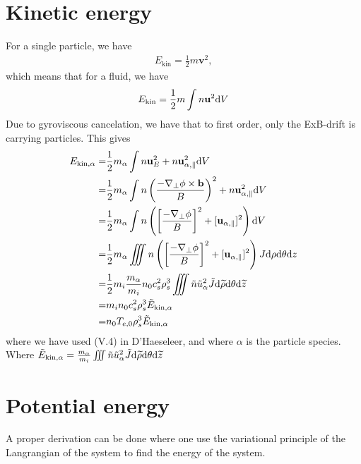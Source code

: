 \section{Kinetic energy}
For a single particle, we have
%
\begin{align*}
E_{\text{kin}} = \frac{1}{2}m\mathbf{v}^2,
\end{align*}
%
which means that for a fluid, we have
%
\begin{align*}
E_{\text{kin}}=\frac{1}{2}m\int n\mathbf{u}^2 \text{d} V
\end{align*}
%
Due to gyroviscous cancelation, we have that to first order, only the ExB-drift is carrying particles.
This gives
%
\begin{align*}
    E_{\text{kin},\alpha}
    =& \frac{1}{2}m_{\alpha}\int
       n\mathbf{u}_E^2
       + n\mathbf{u}_{\alpha,\parallel}^2 \text{d} V
     \\
    =& \frac{1}{2}m_{\alpha}\int
       n\left(\frac{-\nabla_\perp\phi
              \times\mathbf{b}}{B}\right)^2
       + n\mathbf{u}_{\alpha,\parallel}^2 \text{d} V
    \\
    =& \frac{1}{2}m_{\alpha}\int
       n\left(\left[\frac{-\nabla_\perp\phi}{B}\right]^2
       + [\mathbf{u}_{\alpha,\parallel}]^2\right) \text{d} V
   \\
    =& \frac{1}{2}m_{\alpha}\iiint
       n\left(\left[\frac{-\nabla_\perp\phi}{B}\right]^2
       + [\mathbf{u}_{\alpha,\parallel}]^2\right)
       J \text{d}\rho \text{d}\theta \text{d} z
    \\
    =& \frac{1}{2}m_i\frac{m_{\alpha}}{m_i}
       n_0c_s^2\rho_s^3
       \iiint
       \tilde{n}\tilde{u}_\alpha^2
       \tilde{J} \text{d} \widetilde{ \rho} \text{d}\theta \text{d} \widetilde{ z}
    \\
    =& m_in_0c_s^2\rho_s^3 \tilde{E}_{\text{kin},\alpha}
    \\
    =& n_0T_{e,0}\rho_s^3 \tilde{E}_{\text{kin},\alpha}
\end{align*}
%
where we have used (V.4) in D'Haeseleer, and where $\alpha$ is the particle species.
Where $\tilde{E}_{\text{kin},\alpha} = \frac{m_{\alpha}}{m_i}\iiint \tilde{n}\tilde{u}_\alpha^2 \tilde{J} \text{d} \widetilde{ \rho} \text{d}\theta \text{d} \widetilde{ z}$

\section{Potential energy}
%
A proper derivation can be done where one use the variational principle of the Langrangian of the system to find the energy of the system.


